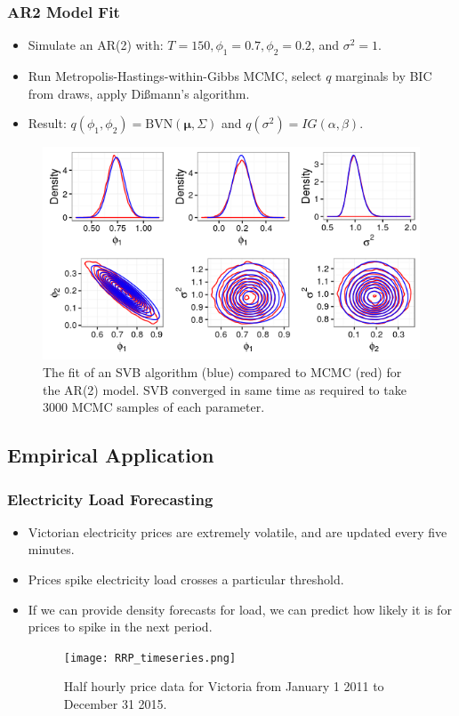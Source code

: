 \documentclass{beamer}\usepackage[]{graphicx}\usepackage[]{color}
\begin{document}
\begin{frame}
\frametitle{AR2 Model Fit}
\begin{itemize}
\item Simulate an AR(2) with: $T = 150, \phi_1 = 0.7, \phi_2 = 0.2$, and $\sigma^2 = 1$.
\item Run Metropolis-Hastings-within-Gibbs MCMC, select $q$ marginals by BIC from draws, apply Di{\ss}mann's algorithm.
\item Result: $q(\phi_1, \phi_2) = \mbox{BVN}(\boldsymbol{\mu}, \Sigma)$ and $q(\sigma^2) = IG(\alpha, \beta)$. 
\end{itemize}
\begin{figure}[h]
\centering
\includegraphics[scale = 0.4]{VBfit.png}
\caption{The fit of an SVB algorithm (blue) compared to MCMC (red) for the AR(2) model. SVB converged in same time as required to take 3000 MCMC samples of each parameter.}
\label{fig:VBfit}
\end{figure}
\end{frame}


\begin{frame}
\section{Empirical Application}
\frametitle{Electricity Load Forecasting}
\begin{itemize}
\item Victorian electricity prices are extremely volatile, and are updated every five minutes.
\item Prices spike electricity load crosses a particular threshold.
\item If we can provide density forecasts for load, we can predict how likely it is for prices to spike in the next period.
\begin{figure}[h]
\centering
\texttt{[image: RRP\_timeseries.png]}
\caption{Half hourly price data for Victoria from January 1 2011 to December 31 2015.}
\label{fig:rrpplot}
\end{figure}
\end{itemize}
\end{frame}
\end{document}
